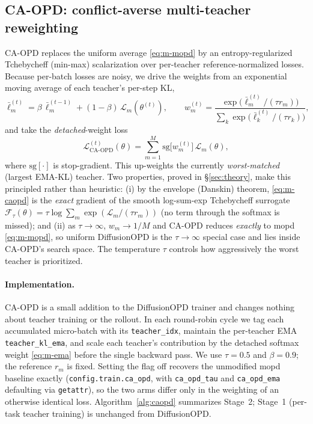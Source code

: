 \subsection{CA-OPD: conflict-averse multi-teacher reweighting}
\label{sec:m-caopd}

CA-OPD replaces the uniform average \eqref{eq:m-mopd} by an
entropy-regularized Tchebycheff (min-max) scalarization over per-teacher
reference-normalized losses. Because per-batch losses are noisy, we drive the
weights from an exponential moving average of each teacher's per-step KL,
\begin{equation}
\label{eq:m-ema}
\bar\ell_m^{(t)}=\beta\,\bar\ell_m^{(t-1)}+(1-\beta)\,\mathcal L_m(\theta^{(t)}),
\qquad
w_m^{(t)}=\frac{\exp\!\bigl(\bar\ell_m^{(t)}/(\tau r_m)\bigr)}{\sum_{k}\exp\!\bigl(\bar\ell_k^{(t)}/(\tau r_k)\bigr)},
\end{equation}
and take the \emph{detached}-weight loss
\begin{equation}
\label{eq:m-caopd}
\mathcal L_{\mathrm{CA\text{-}OPD}}^{(t)}(\theta)=\sum_{m=1}^M \mathrm{sg}\!\bigl[w_m^{(t)}\bigr]\,\mathcal L_m(\theta),
\end{equation}
where $\mathrm{sg}[\cdot]$ is stop-gradient. This up-weights the currently
\emph{worst-matched} (largest EMA-KL) teacher. Two properties, proved in
\S\ref{sec:theory}, make this principled rather than heuristic: (i) by the
envelope (Danskin) theorem, \eqref{eq:m-caopd} is the \emph{exact} gradient of
the smooth log-sum-exp Tchebycheff surrogate
$\mathcal F_\tau(\theta)=\tau\log\sum_m\exp(\mathcal L_m/(\tau r_m))$ (no term
through the softmax is missed); and (ii) as $\tau\to\infty$, $w_m\to1/M$ and CA-OPD
reduces \emph{exactly} to mopd \eqref{eq:m-mopd}, so uniform DiffusionOPD is the
$\tau\to\infty$ special case and lies inside CA-OPD's search space. The
temperature $\tau$ controls how aggressively the worst teacher is prioritized.

\paragraph{Implementation.}
CA-OPD is a small addition to the DiffusionOPD trainer and changes nothing about
teacher training or the rollout. In each round-robin cycle we tag each
accumulated micro-batch with its \texttt{teacher\_idx}, maintain the per-teacher
EMA \texttt{teacher\_kl\_ema}, and scale each teacher's contribution by the
detached softmax weight \eqref{eq:m-ema} before the single backward pass. We use
$\tau{=}0.5$ and $\beta{=}0.9$; the reference $r_m$ is fixed. Setting the flag off
recovers the unmodified mopd baseline exactly (\texttt{config.train.ca\_opd}, with
\texttt{ca\_opd\_tau} and \texttt{ca\_opd\_ema} defaulting via \texttt{getattr}),
so the two arms differ only in the weighting of an otherwise identical loss.
Algorithm~\ref{alg:caopd} summarizes Stage~2; Stage~1 (per-task teacher training)
is unchanged from DiffusionOPD.

